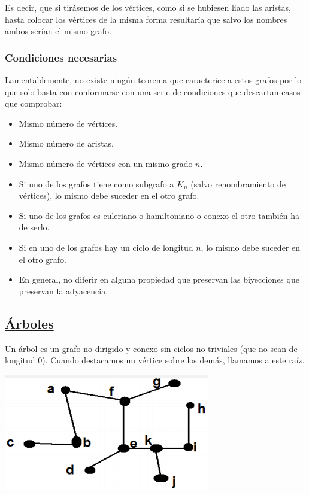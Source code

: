 \documentclass[10pt,a4paper,openright]{book}
\begin{document}
Es decir, que si tirásemos de los vértices, como si se hubiesen liado las aristas, hasta colocar los vértices de la misma forma resultaría que salvo los nombres ambos serían el mismo grafo.

\subsubsection*{Condiciones necesarias}
Lamentablemente, no existe ningún teorema que caracterice a estos grafos por lo que solo basta con conformarse con una serie de condiciones que descartan casos que comprobar:
\begin{itemize}
\item Mismo número de vértices.
\item Mismo número de aristas.
\item Mismo número de vértices con un mismo grado $n$.
\item Si uno de los grafos tiene como subgrafo a $K_n$ (salvo renombramiento de vértices), lo mismo debe suceder en el otro grafo.
\item Si uno de los grafos es euleriano o hamiltoniano o conexo el otro también ha de serlo.
\item Si en uno de los grafos hay un ciclo de longitud $n$, lo mismo debe suceder en el otro grafo.
\item En general, no diferir en alguna propiedad que preservan las biyecciones que preservan la adyacencia.
\end{itemize}

\subsection*{\underline{Árboles}}
Un árbol es un grafo no dirigido y conexo sin ciclos no triviales (que no sean de longitud 0). Cuando destacamos un vértice sobre los demás, llamamos a este raíz.

\begin{center}
\includegraphics[scale=0.65]{arbol}
\end{center}
\end{document}
